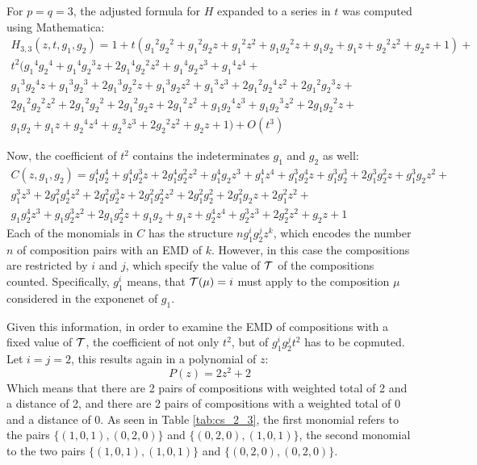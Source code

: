 \documentclass[12pt,letterpaper,oneside,openany]{book}
\begin{document}
For $p=q=3$, the adjusted formula for $H$ expanded to a series in $t$ was computed using Mathematica:
\begin{multline*}
	H_{3, 3}(z, t, g_1, g_2)=1+t ({g_1}^2 {g_2}^2+{g_1}^2 {g_2} z+{g_1}^2 z^2+{g_1} {g_2}^2 z+{g_1} {g_2}+{g_1} z+{g_2}^2 z^2+{g_2} z+1)+\\t^2 ({g_1}^4 {g_2}^4+{g_1}^4 {g_2}^3 z+2 {g_1}^4 {g_2}^2 z^2+{g_1}^4 {g_2} z^3+{g_1}^4 z^4+\\{g_1}^3 {g_2}^4 z+{g_1}^3 {g_2}^3+2 {g_1}^3 {g_2}^2 z+{g_1}^3 {g_2} z^2+{g_1}^3 z^3+2 {g_1}^2 {g_2}^4 z^2+2 {g_1}^2 {g_2}^3 z+\\2 {g_1}^2 {g_2}^2 z^2+2 {g_1}^2 {g_2}^2+2 {g_1}^2 {g_2} z+2 {g_1}^2 z^2+{g_1} {g_2}^4 z^3+{g_1} {g_2}^3 z^2+2 {g_1} {g_2}^2 z+\\{g_1} {g_2}+{g_1} z+{g_2}^4 z^4+{g_2}^3 z^3+2 {g_2}^2 z^2+{g_2} z+1)+O(t^3)
\end{multline*}


Now, the coefficient of $t^2$ contains the indeterminates $g_1$ and $g_2$ as well:
\begin{multline*}
	C(z, g_1, g_2)=g_1^4 g_2^4+g_1^4 g_2^3 z+2 g_1^4 g_2^2 z^2+g_1^4 g_2 z^3+g_1^4 z^4+g_1^3 g_2^4 z+g_1^3 g_2^3+2 g_1^3 g_2^2 z+g_1^3 g_2 z^2+ \\
	g_1^3 z^3+2 g_1^2 g_2^4 z^2+2 g_1^2 g_2^3 z+2 g_1^2 g_2^2 z^2+2 g_1^2 g_2^2+2 g_1^2 g_2 z+2 g_1^2 z^2+\\
	g_1 g_2^4 z^3+g_1 g_2^3 z^2+2 g_1 g_2^2 z+g_1 g_2+g_1 z+g_2^4 z^4+g_2^3 z^3+2 g_2^2 z^2+g_2 z+1
\end{multline*}
Each of the monomials in $C$ has the structure $ng_1^ig_2^jz^k$, which encodes the number $n$ of composition pairs with an EMD of $k$. However, in this case the compositions are restricted by $i$ and $j$, which specify the value of ${\mathcal{T}}$ of the compositions counted. 
Specifically, $g_1^i$ means, that ${\mathcal{T}}(\mu)=i$ must apply to the composition $\mu$ considered in the exponenet of $g_1$.

Given this information, in order to examine the EMD of compositions with a fixed value of ${\mathcal{T}}$, the coefficient of not only $t^2$, but of $g_1^ig_2^jt^2$ has to be copmuted. Let $i=j=2$, this results again in a polynomial of $z$:
$$P(z)=2 z^2+2$$
Which means that there are 2 pairs of compositions with weighted total of  2 and a distance of 2, and there are 2 pairs of compositions with a weighted total of 0 and a distance of 0. As seen in Table \ref{tab:cs_2_3}, the first monomial refers to the pairs $\{(1, 0, 1), (0, 2, 0)\}$ and $ \{(0, 2, 0), (1, 0, 1)\}$, the second monomial to the two pairs $\{(1, 0, 1), (1, 0, 1)\}$ and $\{(0, 2, 0), (0, 2, 0)\}$.
\end{document}
